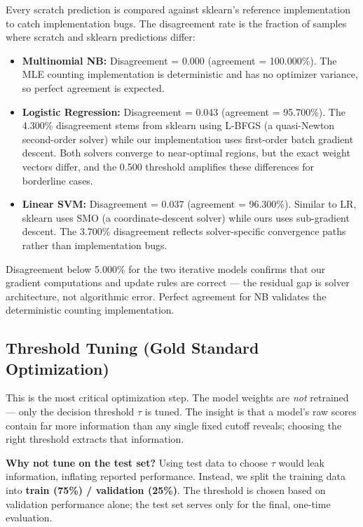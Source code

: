 Every scratch prediction is compared against sklearn's reference implementation to catch implementation bugs. The disagreement rate is the fraction of samples where scratch and sklearn predictions differ:

\begin{itemize}
  \item \textbf{Multinomial NB:} Disagreement = 0.000 (agreement = 100.000\%). The MLE counting implementation is deterministic and has no optimizer variance, so perfect agreement is expected.
  \item \textbf{Logistic Regression:} Disagreement = 0.043 (agreement = 95.700\%). The 4.300\% disagreement stems from sklearn using L-BFGS (a quasi-Newton second-order solver) while our implementation uses first-order batch gradient descent. Both solvers converge to near-optimal regions, but the exact weight vectors differ, and the 0.500 threshold amplifies these differences for borderline cases.
  \item \textbf{Linear SVM:} Disagreement = 0.037 (agreement = 96.300\%). Similar to LR, sklearn uses SMO (a coordinate-descent solver) while ours uses sub-gradient descent. The 3.700\% disagreement reflects solver-specific convergence paths rather than implementation bugs.
\end{itemize}

Disagreement below 5.000\% for the two iterative models confirms that our gradient computations and update rules are correct — the residual gap is solver architecture, not algorithmic error. Perfect agreement for NB validates the deterministic counting implementation.

\subsection{Threshold Tuning (Gold Standard Optimization)}

This is the most critical optimization step. The model weights are \textit{not} retrained — only the decision threshold $\tau$ is tuned. The insight is that a model's raw scores contain far more information than any single fixed cutoff reveals; choosing the right threshold extracts that information.

\textbf{Why not tune on the test set?} Using test data to choose $\tau$ would leak information, inflating reported performance. Instead, we split the training data into \textbf{train (75\%) / validation (25\%)}. The threshold is chosen based on validation performance alone; the test set serves only for the final, one-time evaluation.

